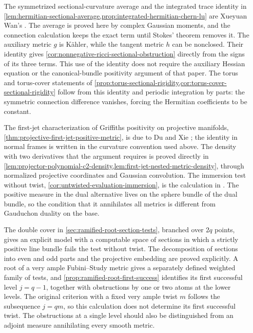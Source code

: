 \label{hist:integrated-hermitian-curvature}
The symmetrized sectional-curvature average and the integrated trace identity in \cref{lem:hermitian-sectional-average,prop:integrated-hermitian-chern-lu} are Xueyuan Wan's \cite[v1, Lemma~2.1 and Proposition~3.3 with Lemmas~3.1--3.2, pp.~5--8]{WanHermitianSectional26}. The average is proved here by complex Gaussian moments, and the connection calculation keeps the exact term until Stokes' theorem removes it. The auxiliary metric $g$ is K\"ahler, while the tangent metric $h$ can be nonclosed. Their identity gives \cref{cor:nonnegative-ricci-sectional-obstruction} directly from the signs of its three terms. This use of the identity does not require the auxiliary Hessian equation or the canonical-bundle positivity argument of that paper. The torus and torus-cover statements of \cref{prop:torus-sectional-rigidity,cor:torus-cover-sectional-rigidity} follow from this identity and periodic integration by parts: the symmetric connection difference vanishes, forcing the Hermitian coefficients to be constant.

The first-jet characterization of Griffiths positivity on projective manifolds, \cref{thm:projective-first-jet-positive-metric}, is due to Du and Xie \cite[v1, Theorem~1.1 and Proposition~2.1, pp.~2--5]{DuXieFirstJet26}; the identity in normal frames is written in the curvature convention used above. The density with two derivatives that the argument requires is proved directly in \cref{lem:projector-polynomial-c2-density,lem:first-jet-nested-metric-density}, through normalized projective coordinates and Gaussian convolution. The immersion test without twist, \cref{cor:untwisted-evaluation-immersion}, is the calculation in \cite[v1, Section~3.1, pp.~7--8]{DuXieFirstJet26}. The positive measure in the dual alternative lives on the sphere bundle of the dual bundle, so the condition that it annihilates all metrics is different from Gauduchon duality on the base.

The double cover in \cref{sec:ramified-root-section-tests}, branched over $2q$ points, gives an explicit model with a computable space of sections in which a strictly positive line bundle fails the test without twist. The decomposition of sections into even and odd parts and the projective embedding are proved explicitly. A root of a very ample Fubini--Study metric gives a separately defined weighted family of tests, and \cref{prop:ramified-root-first-success} identifies its first successful level $j=q-1$, together with obstructions by one or two atoms at the lower levels. The original criterion with a fixed very ample twist $m$ follows the subsequence $j=qm$, so this calculation does not determine its first successful twist. The obstructions at a single level should also be distinguished from an adjoint measure annihilating every smooth metric.

